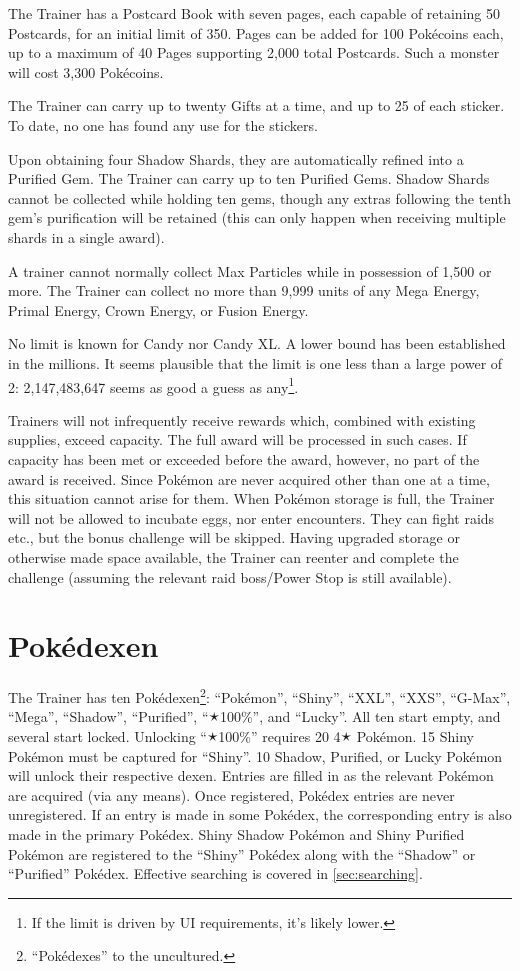 The Trainer has a Postcard Book with seven pages, each capable of retaining
 50 Postcards, for an initial limit of 350.
Pages can be added for 100 Pokécoins each, up to a maximum of 40 Pages
 supporting 2,000 total Postcards.
Such a monster will cost 3,300 Pokécoins.

The Trainer can carry up to twenty Gifts at a time, and up to 25 of each sticker.
To date, no one has found any use for the stickers.

Upon obtaining four Shadow Shards, they are automatically refined into a Purified Gem.
The Trainer can carry up to ten Purified Gems.
Shadow Shards cannot be collected while holding ten gems, though any extras
 following the tenth gem's purification will be retained (this can only
 happen when receiving multiple shards in a single award).

A trainer cannot normally collect Max Particles while in possession of 1,500 or more.
The Trainer can collect no more than 9,999 units of any Mega Energy,
 Primal Energy, Crown Energy, or Fusion Energy.

No limit is known for Candy nor Candy XL\@.
A lower bound has been established in the millions.
It seems plausible that the limit is one less than a large power of 2:
  2,147,483,647 seems as good a guess as any\footnote{If the limit is driven by UI requirements, it's likely lower.}.

Trainers will not infrequently receive rewards which, combined with existing supplies, exceed capacity.
The full award will be processed in such cases.
If capacity has been met or exceeded before the award, however, no part of the award is received.
Since Pokémon are never acquired other than one at a time, this situation cannot
 arise for them.
When Pokémon storage is full, the Trainer will not be allowed to incubate eggs,
 nor enter encounters.
They can fight raids etc., but the bonus challenge will be skipped.
Having upgraded storage or otherwise made space available, the Trainer can
 reenter and complete the challenge (assuming the relevant raid boss/Power Stop is
 still available).

\section{Pokédexen\label{sec:dexen}}
The Trainer has ten Pokédexen\footnote{``Pokédexes'' to the uncultured.}:
  ``Pokémon'', ``Shiny'', ``XXL'', ``XXS'', ``G-Max'', ``Mega'', ``Shadow'',
  ``Purified'', ``🟉100\%'', and ``Lucky''.
All ten start empty, and several start locked.
Unlocking ``🟉100\%'' requires 20 4🟉 Pokémon.
15 Shiny Pokémon must be captured for ``Shiny''.
10 Shadow, Purified, or Lucky Pokémon will unlock their respective dexen.
Entries are filled in as the relevant Pokémon are acquired (via any means).
Once registered, Pokédex entries are never unregistered.
If an entry is made in some Pokédex, the corresponding entry is also made
  in the primary Pokédex.
Shiny Shadow Pokémon and Shiny Purified Pokémon are registered to the
  ``Shiny'' Pokédex along with the ``Shadow'' or ``Purified'' Pokédex.
Effective searching is covered in \autoref{sec:searching}.

